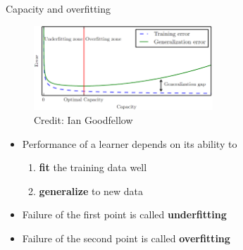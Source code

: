 \documentclass[11pt,compress,t,notes=noshow, xcolor=table]{beamer}
\begin{document}
\begin{vbframe}{Capacity and overfitting}

  \begin{figure}
    \centering
    \includegraphics[width = 0.6\textwidth]{figure_man/lcurve_1.png}
    \tiny{\\ Credit: Ian Goodfellow}
  \end{figure}
  

\begin{itemize}
  \item Performance of a learner depends on its ability to 
    \begin{enumerate}
      \item \textbf{fit} the training data well
      \item \textbf{generalize} to new data
    \end{enumerate}  
  \item Failure of the first point is called \textbf{underfitting}
  \item Failure of the second point is called \textbf{overfitting}
\end{itemize}  


\end{vbframe}
\end{document}
